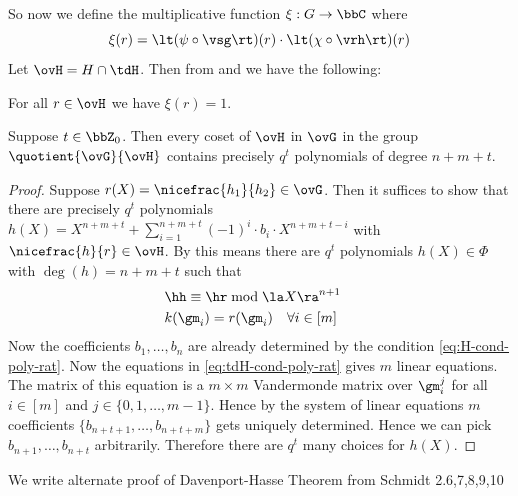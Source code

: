 So now we define the multiplicative function $\xi:G\to\bbC$ where $$\xi(r)=\lt(\psi\circ\vsg\rt)(r)\cdot \lt(\chi\circ\vrh\rt)(r)$$
Let $\ovH=H\cap \tdH$. Then from  and  we have the following:
\begin{corolary}{}{}
  For all $r\in \ovH$ we have $\xi(r)=1$. 
\end{corolary}
\begin{lemma}{}{}
  Suppose $t\in\bbZ_0$. Then every coset of $\ovH$ in $\ovG$ in the group $\quotient{\ovG}{\ovH}$ contains precisely $q^t$ polynomials of degree $n+m+t$. 
\end{lemma}
\begin{proof}
  Suppose $r(X)=\nicefrac{h_1}{h_2}\in \ovG$. Then it suffices to show that there are precisely $q^t$ polynomials $h(X)=X^{n+m+t}+\sum_{i=1}^{n+m+t}(-1)^i\cdot b_i\cdot X^{n+m+t-i}$ with $\nicefrac{h}{r}\in\ovH$. By  this means there are $q^t$ polynomials $h(X)\in\Phi$ with $\deg(h)=n+m+t$ such that \begin{align}
    &\hh \equiv \hr\bmod{\la X\ra^{n+1}} \label{eq:H-cond-poly-rat}&\\
    &k(\gm_i) = r(\gm_i) \quad \forall i\in[m] \label{eq:tdH-cond-poly-rat}&
  \end{align}  Now the coefficients $b_1,\dots, b_n$ are already determined by the condition \eqref{eq:H-cond-poly-rat}. Now the equations in \eqref{eq:tdH-cond-poly-rat} gives $m$ linear equations. The matrix of this equation is a $m\times m$ Vandermonde matrix over $\gm_i^j$ for all $i\in[m]$ and $j\in\{0,1,\dots, m-1\}$. Hence by the system of linear equations $m$ coefficients $\{b_{n+t+1},\dots, b_{n+t+m}\}$ gets uniquely determined. Hence we can pick $b_{n+1},\dots, b_{n+t}$ arbitrarily. Therefore there are $q^t$ many choices for $h(X)$. 
\end{proof}

We write alternate proof of Davenport-Hasse Theorem from Schmidt 2.{6,7,8,9,10}